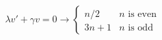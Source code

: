 \documentclass[preview]{standalone}
\begin{document}
\begin{align*}
\lambda v' + \gamma v = 0 \longrightarrow \begin{cases}n/2  & n \text{ is even} \\3n+1 & n \text{ is odd}\end{cases}
\end{align*}
\end{document}
